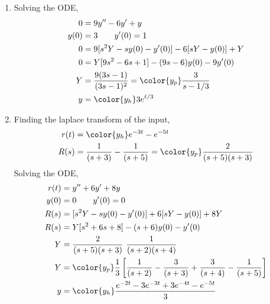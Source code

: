 \begin{enumerate}
    \item Solving the ODE,
          \begin{align}
              0    & = 9y'' - 6y'  + y                                        \\
              y(0) & = 3 \qquad y'(0) = 1                                     \\
              0    & = 9[s^2Y - sy(0) - y'(0)] - 6[sY - y(0)] + Y             \\
              0    & = Y[9s^2 - 6s + 1] - (9s - 6) y(0) - 9y'(0)              \\
              Y    & = \frac{9(3s-1)}{(3s-1)^2} = \color{y_p} \frac{3}{s-1/3} \\
              y    & = \color{y_h} 3e^{t/3}
          \end{align}

    \item Finding the laplace transform of the input,
          \begin{align}
              r(t) & = \color{y_h}e^{-3t} - e^{-5t}      \\
              R(s) & = \frac{1}{(s+3)} - \frac{1}{(s+5)}
              = \color{y_p} \frac{2}{(s+5)(s+3)}
          \end{align}
          Solving the ODE,
          \begin{align}
              r(t) & = y'' + 6y'  + 8y                                               \\
              y(0) & = 0 \qquad y'(0) = 0                                            \\
              R(s) & = [s^2Y - sy(0) - y'(0)] + 6[sY - y(0)] + 8Y                    \\
              R(s) & = Y[s^2 + 6s + 8] - (s + 6) y(0) - y'(0)                        \\
              Y    & = \frac{2}{(s+5)(s+3)} \ \frac{1}{(s+2)(s+4)}                   \\
              Y    & = \color{y_p} \frac{1}{3} \left[ \frac{1}{(s+2)}
              - \frac{3}{(s+3)} + \frac{3}{(s+4)} - \frac{1}{(s+5)} \right]          \\
              y    & = \color{y_h} \frac{e^{-2t} - 3e^{-3t} + 3e^{-4t} - e^{-5t}}{3}
          \end{align}


\end{enumerate}
